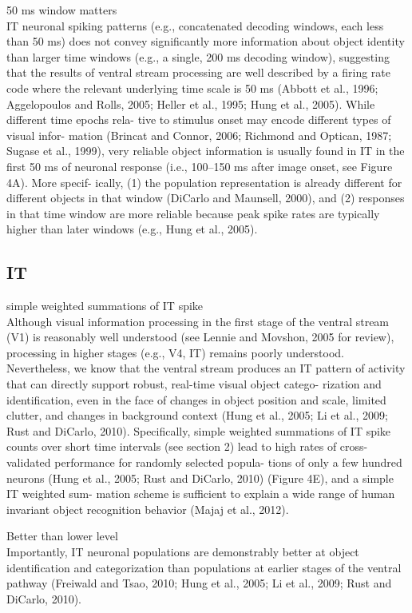 50 ms window matters\\
IT neuronal spiking patterns (e.g., concatenated decoding
windows, each less than 50 ms) does not convey significantly
more information about object identity than larger time windows
(e.g., a single, 200 ms decoding window), suggesting that the
results of ventral stream processing are well described by a firing
rate code where the relevant underlying time scale is 50 ms
(Abbott et al., 1996; Aggelopoulos and Rolls, 2005; Heller
et al., 1995; Hung et al., 2005). While different time epochs rela-
tive to stimulus onset may encode different types of visual infor-
mation (Brincat and Connor, 2006; Richmond and Optican,
1987; Sugase et al., 1999), very reliable object information is
usually found in IT in the first 50 ms of neuronal response
(i.e., 100–150 ms after image onset, see Figure 4A). More specif-
ically, (1) the population representation is already different for
different objects in that window (DiCarlo and Maunsell, 2000),
and (2) responses in that time window are more reliable because
peak spike rates are typically higher than later windows (e.g.,
Hung et al., 2005).

\subsection{IT}
simple weighted summations of IT spike\\
Although visual information processing in the first stage of the
ventral stream (V1) is reasonably well understood (see Lennie
and Movshon, 2005 for review), processing in higher stages
(e.g., V4, IT) remains poorly understood. Nevertheless, we
know that the ventral stream produces an IT pattern of activity
that can directly support robust, real-time visual object catego-
rization and identification, even in the face of changes in object
position and scale, limited clutter, and changes in background
context (Hung et al., 2005; Li et al., 2009; Rust and DiCarlo,
2010). Specifically, simple weighted summations of IT spike
counts over short time intervals (see section 2) lead to high rates
of cross-validated performance for randomly selected popula-
tions of only a few hundred neurons (Hung et al., 2005; Rust
and DiCarlo, 2010) (Figure 4E), and a simple IT weighted sum-
mation scheme is sufficient to explain a wide range of human
invariant object recognition behavior (Majaj et al., 2012).

Better than lower level\\
Importantly, IT neuronal populations are demonstrably better
at object identification and categorization than populations
at earlier stages of the ventral pathway (Freiwald and Tsao,
2010; Hung et al., 2005; Li et al., 2009; Rust and DiCarlo,
2010).

